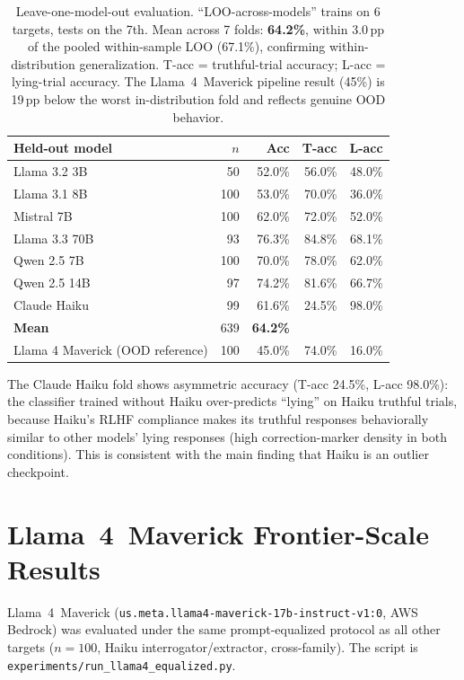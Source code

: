 \begin{table}[h]
\centering
\caption{Leave-one-model-out evaluation. ``LOO-across-models'' trains on 6 targets, tests on the 7th. Mean across 7 folds: \textbf{64.2\%}, within 3.0\,pp of the pooled within-sample LOO (67.1\%), confirming within-distribution generalization. T-acc = truthful-trial accuracy; L-acc = lying-trial accuracy. The Llama~4~Maverick pipeline result (45\%) is 19\,pp below the worst in-distribution fold and reflects genuine OOD behavior.}
\label{tab:loo_across_models}
\begin{tabular}{lrrrr}
\toprule
\textbf{Held-out model} & \textbf{$n$} & \textbf{Acc} & \textbf{T-acc} & \textbf{L-acc} \\
\midrule
Llama 3.2 3B   & 50  & 52.0\% & 56.0\% & 48.0\% \\
Llama 3.1 8B   & 100 & 53.0\% & 70.0\% & 36.0\% \\
Mistral 7B     & 100 & 62.0\% & 72.0\% & 52.0\% \\
Llama 3.3 70B  & 93  & 76.3\% & 84.8\% & 68.1\% \\
Qwen 2.5 7B    & 100 & 70.0\% & 78.0\% & 62.0\% \\
Qwen 2.5 14B   & 97  & 74.2\% & 81.6\% & 66.7\% \\
Claude Haiku   & 99  & 61.6\% & 24.5\% & 98.0\% \\
\midrule
\textbf{Mean} & 639 & \textbf{64.2\%} & & \\
\midrule
Llama 4 Maverick (OOD reference) & 100 & 45.0\% & 74.0\% & 16.0\% \\
\bottomrule
\end{tabular}
\end{table}

The Claude Haiku fold shows asymmetric accuracy (T-acc 24.5\%, L-acc 98.0\%): the classifier trained without Haiku over-predicts ``lying'' on Haiku truthful trials, because Haiku's RLHF compliance makes its truthful responses behaviorally similar to other models' lying responses (high correction-marker density in both conditions). This is consistent with the main finding that Haiku is an outlier checkpoint.

\section{Llama~4~Maverick Frontier-Scale Results}\label{app:llama405b_results}

Llama~4~Maverick (\texttt{us.meta.llama4-maverick-17b-instruct-v1:0}, AWS Bedrock) was evaluated under the same prompt-equalized protocol as all other targets ($n\!=\!100$, Haiku interrogator/extractor, cross-family). The script is \texttt{experiments/run\_llama4\_equalized.py}.

